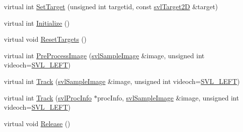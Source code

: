 \begin{DoxyCompactItemize}
virtual int \hyperlink{classsvl_tracker_m_s_brute_force_a9125651c10a859a3644eb270a14a7832}{Set\-Target} (unsigned int targetid, const \hyperlink{structsvl_target2_d}{svl\-Target2\-D} \&target)
\item 
virtual int \hyperlink{classsvl_tracker_m_s_brute_force_af4f2a1ebacfc6158d6ea17b41ceada2f}{Initialize} ()
\item 
virtual void \hyperlink{classsvl_tracker_m_s_brute_force_a3763e4631332c34d4d7408928e921932}{Reset\-Targets} ()
\item 
virtual int \hyperlink{classsvl_tracker_m_s_brute_force_aa252636897f247f1e27d35c4e32c6523}{Pre\-Process\-Image} (\hyperlink{classsvl_sample_image}{svl\-Sample\-Image} \&image, unsigned int videoch=\hyperlink{svl_definitions_8h_ab9fec7615f19c8df2919eebcab0b187f}{S\-V\-L\-\_\-\-L\-E\-F\-T})
\item 
virtual int \hyperlink{classsvl_tracker_m_s_brute_force_af693efc065120ce40c3f311a787c37bd}{Track} (\hyperlink{classsvl_sample_image}{svl\-Sample\-Image} \&image, unsigned int videoch=\hyperlink{svl_definitions_8h_ab9fec7615f19c8df2919eebcab0b187f}{S\-V\-L\-\_\-\-L\-E\-F\-T})
\item 
virtual int \hyperlink{classsvl_tracker_m_s_brute_force_acf680657566ae5e363d5d40922d50024}{Track} (\hyperlink{structsvl_proc_info}{svl\-Proc\-Info} $\ast$proc\-Info, \hyperlink{classsvl_sample_image}{svl\-Sample\-Image} \&image, unsigned int videoch=\hyperlink{svl_definitions_8h_ab9fec7615f19c8df2919eebcab0b187f}{S\-V\-L\-\_\-\-L\-E\-F\-T})
\item 
virtual void \hyperlink{classsvl_tracker_m_s_brute_force_a6e263ceb708413cc26709dbaae6700f8}{Release} ()
\end{DoxyCompactItemize}
